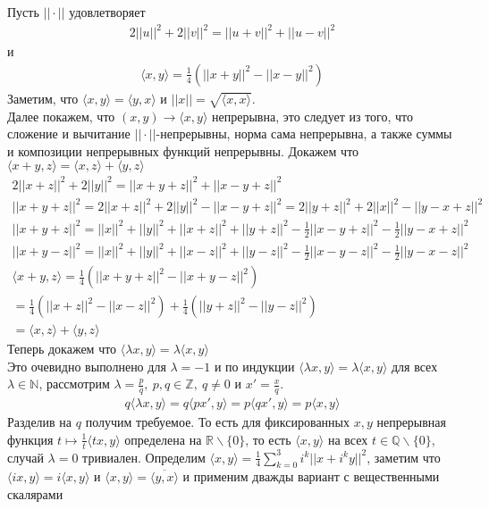 	Пусть $||\cdot||$ удовлетворяет
	\begin{gather*}
		2||u||^2 + 2||v||^2 = ||u + v||^2 + ||u - v||^2
	\end{gather*}
	и
	\begin{gather*}
		\langle x,y \rangle = \frac{1}{4}(||x + y||^2 - ||x - y||^2)
	\end{gather*}
	Заметим, что $\langle x,y \rangle = \langle y,x \rangle$ и $||x|| = \sqrt{\langle x,x \rangle}$.\\
	Далее покажем, что $(x,y) \to \langle x,y \rangle$ непрерывна, это следует из того, что сложение и вычитание $||\cdot||$-непрерывны, норма сама непрерывна, а также суммы и композиции непрерывных функций непрерывны.
	\vskip 0.1in
	Докажем что $\langle x+y, z \rangle = \langle x,z \rangle + \langle y,z \rangle$
	\begin{gather*}
		2||x + z||^2 + 2||y||^2 = ||x + y + z||^2 + ||x - y + z||^2\\
		||x + y + z||^2 = 
		2||x + z||^2 + 2||y||^2 - ||x - y + z||^2 =
		2||y + z||^2 + 2||x||^2 - ||y - x + z||^2\\
		||x + y + z||^2 = ||x||^2 + ||y||^2 + ||x + z||^2 + ||y + z||^2 - \frac{1}{2}||x - y + z||^2 - \frac{1}{2}||y - x + z||^2\\
		||x + y - z||^2 = ||x||^2 + ||y||^2 + ||x - z||^2 + ||y - z||^2 - \frac{1}{2}||x - y - z||^2 - \frac{1}{2}||y - x - z||^2\\
		\langle x+y, z\rangle = 
		\frac{1}{4}(||x + y + z||^2 - ||x + y - z||^2)\\
		= \frac{1}{4}(||x + z||^2 - ||x - z||^2) + \frac{1}{4}(||y + z||^2 - ||y - z||^2)\\
		= \langle x,z \rangle + \langle y,z \rangle
	\end{gather*}
	Теперь докажем что $\langle \lambda x,y \rangle = \lambda \langle x,y \rangle$\\
	Это очевидно выполнено для $\lambda = -1$ и по индукции $\langle \lambda x,y \rangle = \lambda \langle x,y \rangle$ для всех $\lambda \in \mathbb{N}$, рассмотрим $\lambda = \frac{p}{q},\ p,q \in \mathbb{Z},\ q \ne 0$ и $x'= \frac{x}{q}$.
	\begin{gather*}
		q \langle \lambda x, y \rangle = q\langle px', y\rangle = p\langle qx', y \rangle = p\langle x, y\rangle
	\end{gather*}
	Разделив на $q$ получим требуемое. То есть для фиксированных $x,y$ непрерывная функция $t \mapsto \frac{1}{t}\langle tx, y \rangle$ определена на $\mathbb{R} \backslash \{0\}$, то есть $\langle x,y \rangle$ на всех $t \in \mathbb{Q}\backslash \{0\}$, случай $\lambda = 0$ тривиален.
	\vskip 0.1in
	Определим $\langle x,y \rangle = \frac{1}{4} \sum\limits_{k = 0}^{3} i^k ||x + i^k y||^2$, заметим что $\langle ix, y \rangle = i \langle x,y \rangle$ и $\langle x,y \rangle = \overline{\langle y,x \rangle}$ и применим дважды вариант с вещественными скалярами 
\vskip 0.4in

